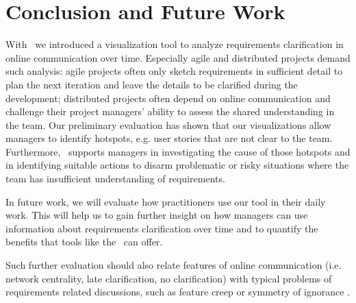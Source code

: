 \section{Conclusion and Future Work}
With \viss\ we introduced a visualization tool to analyze requirements clarification in online communication over time.
Especially agile and distributed projects demand such analysis: agile projects often only sketch requirements in sufficient detail to plan the next iteration and leave the details to be clarified during the development; distributed projects often depend on online communication and challenge their project managers' ability to assess the shared understanding in the team. 
Our preliminary evaluation has shown that our visualizations allow managers to identify hotspots, e.g. user stories that are not clear to the team. 
Furthermore, \viss\ supports managers in investigating the cause of those hotspots and in identifying suitable actions to disarm problematic or risky situations where the team has insufficient understanding of requirements.
 
In future work, we will evaluate how practitioners use our tool in their daily work. 
This will help us to gain further insight on how managers can use information about requirements clarification over time and to quantify the benefits that tools like the \viss\ can offer.

Such further evaluation should also relate features of online communication (i.e. network centrality, late clarification, no clarification) with typical problems of requirements related discussions, such as feature creep \cite{Jones1996} or symmetry of ignorance \cite{Fischer2000}.